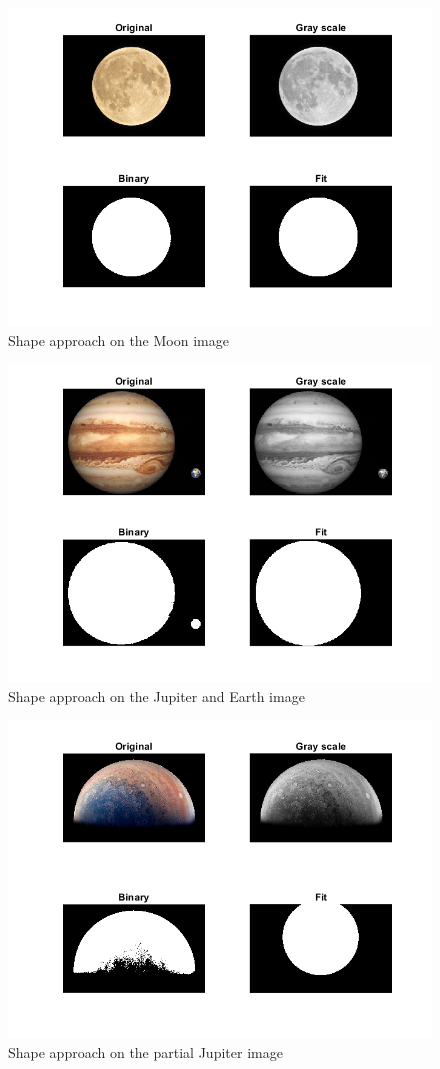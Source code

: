 \begin{figure}[!ht]
    \centering
    \includegraphics[width=0.75\linewidth]{Doc/Graphics/Part3/fit_moon.png}
    \caption{Shape approach on the Moon image}
    \label{fig:RecognitionShapeMoon}
\end{figure}
\begin{figure}[!ht]
    \centering
    \includegraphics[width=0.75\linewidth]{Doc/Graphics/Part3/fit_jupiter_earth.png}
    \caption{Shape approach on the Jupiter and Earth image}
    \label{fig:RecognitionShapeJupiterEarth}
\end{figure}
\begin{figure}[!ht]
    \centering
    \includegraphics[width=0.75\linewidth]{Doc/Graphics/Part3/fit_jupiter_partial.png}
    \caption{Shape approach on the partial Jupiter image}
    \label{fig:RecognitionShapeJupiterPartial}
\end{figure}
\FloatBarrier




